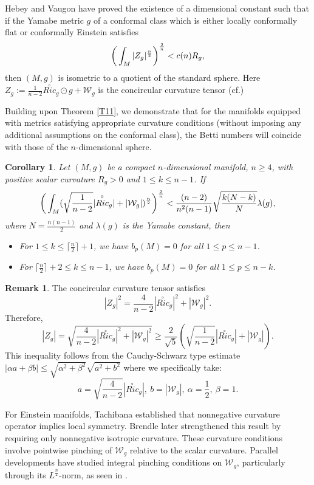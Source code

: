 \documentclass[12pt, twoside]{article}
\newtheorem{corollary}[theorem]{Corollary}
\theoremstyle{definition}
\newtheorem{remark}[theorem]{Remark}
\numberwithin{equation}{section}
\def \a {\alpha }
\def \b {\beta}
\def \la {\lambda}
\begin{document}
Hebey and Vaugon \cite{HV97} have proved the existence of a dimensional constant such that if the Yamabe metric $g$ of a conformal class which is either locally conformally flat or conformally Einstein satisfies
$$\bigg{(}\int_{M}|Z_{g}|^{\frac{n}{2}}\bigg{)}^{\frac{2}{n} }<c(n)R_{g},$$
then $(M,g)$ is isometric to a quotient of the standard sphere.  Here $Z_{g}:=\frac{1}{n-2}\overset{\circ}{Ric}_{g}\odot g+\mathcal{W}_{g}$ is the concircular curvature tensor (cf.\cite{HV97}) 



	Building upon Theorem \ref{T11}, we demonstrate that for the manifolds equipped with metrics satisfying appropriate curvature conditions (without imposing any additional assumptions on the conformal class), the Betti numbers will coincide with those of the $n$-dimensional sphere.
	\begin{corollary}\label{C3}
	Let $(M,g)$ be a compact $n$-dimensional manifold, $n \geq 4$, with positive scalar curvature $R_{g}>0$ and $ 1\leq k\leq n-1$. If 
	$$ \bigg{(}\int_{M}(\sqrt{\frac{ 1}{n-2}}|\overset{\circ}{Ric}_{g}|+|\mathcal{W}_{g}|)^{ \frac{n}{2} }\bigg{)}^{\frac{2}{n} }<\frac{(n-2)}{n^{2}(n-1)}\sqrt{\frac{k(N-k)}{N} }\la(g),$$
	where $N=\frac{n(n-1)}{2}$ and $\la(g)$ is the Yamabe constant, then

	\begin{itemize}
		\item[(1)] For $1\leq k\leq \lceil\frac{n}{2}\rceil+1$, we have $b_{p}(M)=0$ for all $1\leq p\leq n-1$.
		\item[(2)] For $ \lceil\frac{n}{2}\rceil+2\leq k\leq n-1$, we have
		$b_{p}(M)=0$ for all $1\leq p\leq n-k$.
	\end{itemize}
\end{corollary}
\begin{remark}
The  concircular curvature tensor satisfies $$|Z_{g}|^{2}=\frac{4}{n-2}|\overset{\circ}{Ric}_{g}|^{2}+|\mathcal{W}_{g}|^{2}.$$
Therefore,
$$|Z_{g}|=\sqrt{\frac{4}{n-2}|\overset{\circ}{Ric}_{g}|^{2}+|\mathcal{W}_{g}|^{2} }\geq\frac{2}{\sqrt{5}}(\sqrt{\frac{ 1}{n-2}}|\overset{\circ}{Ric}_{g}|+|\mathcal{W}_{g}|).$$
This inequality follows from the Cauchy-Schwarz type estimate
$|\a a+\b b|\leq\sqrt{\a^{2}+\b^{2} }\sqrt{a^{2}+b^{2}}$
where we specifically take:
$$
a= \sqrt{\frac{4}{n-2}}|\overset{\circ}{Ric}_{g}|, \ b=|\mathcal{W}_{g}|, \ \alpha=\frac{1}{2}, \ \beta= 1.$$

\end{remark}
For Einstein manifolds, Tachibana \cite{Tac74} established that nonnegative curvature operator implies local symmetry. Brendle \cite{Bre10} later strengthened this result by requiring only nonnegative isotropic curvature. These curvature conditions involve pointwise pinching of $\mathcal{W}_{g}$ relative to the scalar curvature. Parallel developments have studied integral pinching conditions on $\mathcal{W}_{g}$, particularly through its $L^{\frac{n}{2}}$-norm, as seen in \cite{Cat16,IS02,Sin92}.
\end{document}
